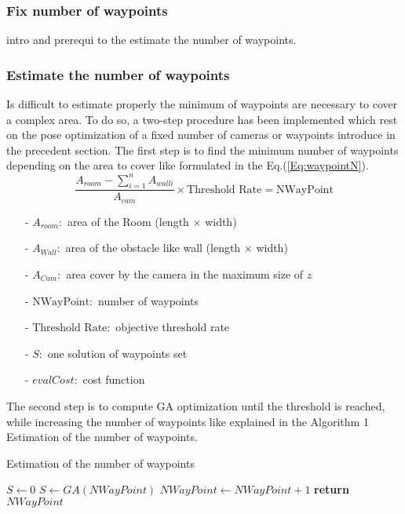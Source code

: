 				\subsubsection{Fix number of waypoints}
				intro  and prerequi to  the estimate the number of waypoints.
				\subsubsection{Estimate the number of waypoints}
Is difficult to estimate properly the minimum of waypoints are necessary to cover a complex area.
To do so, a two-step procedure has been implemented which rest on the pose optimization of a fixed number of cameras or waypoints introduce in the precedent section. 
The first step is to find the minimum number of waypoints depending on the area to cover like formulated in the
 Eq.(\ref{Eq:waypointN}). \\
\begin{equation}\label{Eq:waypointN}
\frac{ A_{room} - \sum_{i=1}^n A_{wall i} }{A_{cam}} \times \mbox{Threshold Rate} = \mbox{NWayPoint}
\end{equation}

\begin{itemize}
\item[-] $ A_{room}: $  area of the Room (length $\times$ width)
\item[-] $ A_{Wall}: $  area of the obstacle like wall (length $\times$ width)
\item[-] $ A_{Cam}: $   area cover by the camera in the maximum size of $z$
\item[-] $ \mbox{NWayPoint}: $  number of waypoints
\item[-] $ \mbox{Threshold Rate}: $ objective threshold rate 
\item[-] $S:$ one solution of waypoints set 
\item[-] $evalCost:$ cost function  
\end{itemize}

The second step is to compute GA optimization until the threshold is reached, while increasing the number of waypoints like explained in the Algorithm 1 Estimation of the number of waypoints.  

\begin{algorithm}{}
\caption{Estimation of the number of waypoints}\label{alg:euclid}
\begin{algorithmic}[6]
 \State $S\gets 0$
	 \State $S \gets GA(NWayPoint)$
	  \State $NWayPoint\gets NWayPoint+1$
  \EndWhile\label{endwhile}
\State \textbf{return} $NWayPoint$
\EndProcedure
\end{algorithmic}
\end{algorithm}


